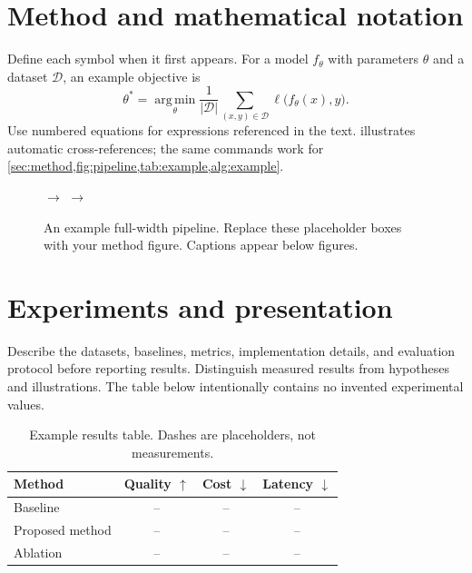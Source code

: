 \documentclass[10pt,letterpaper]{article}
\begin{document}
\section{Method and mathematical notation}
\label{sec:method}
Define each symbol when it first appears. For a model $f_\theta$ with
parameters $\theta$ and a dataset $\mathcal{D}$, an example objective is
\begin{equation}
  \theta^* = \operatorname*{arg\,min}_{\theta}
  \frac{1}{|\mathcal{D}|}\sum_{(x,y)\in\mathcal{D}}
  \ell\bigl(f_\theta(x),y\bigr).
  \label{eq:objective}
\end{equation}
Use numbered equations for expressions referenced in the text.
 illustrates automatic cross-references; the same commands
work for \cref{sec:method,fig:pipeline,tab:example,alg:example}.

\begin{figure}[t]
  \centering
  \setlength{\fboxsep}{10pt}
  \hfill$\longrightarrow$\hfill
  \hfill$\longrightarrow$\hfill
  \caption{An example full-width pipeline. Replace these placeholder boxes
  with your method figure. Captions appear below figures.}
  \label{fig:pipeline}
\end{figure}

\section{Experiments and presentation}
\label{sec:experiments}
Describe the datasets, baselines, metrics, implementation details, and
evaluation protocol before reporting results. Distinguish measured results
from hypotheses and illustrations. The table below intentionally contains
no invented experimental values.

\begin{table}[ht]
  \caption{Example results table. Dashes are placeholders, not measurements.}
  \label{tab:example}
  \centering
  \begin{tabular*}{\linewidth}{@{\extracolsep{\fill}}lccc@{}}
    \toprule
    Method & Quality $\uparrow$ & Cost $\downarrow$ & Latency $\downarrow$\\
    \midrule
    Baseline & -- & -- & --\\
    Proposed method & -- & -- & --\\
    Ablation & -- & -- & --\\
    \bottomrule
  \end{tabular*}
\end{table}
\end{document}
